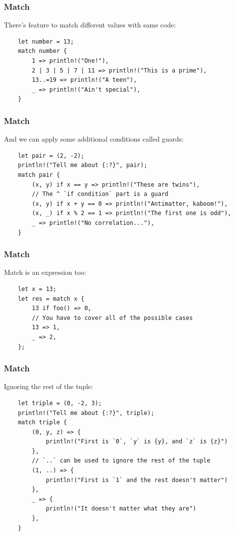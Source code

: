 \documentclass[aspectratio=1610,t]{beamer}
\begin{document}

\begin{frame}[fragile]
\frametitle{Match}
There's feature to match different values with same code:

\begin{verbatim}
    let number = 13;
    match number {
        1 => println!("One!"),
        2 | 3 | 5 | 7 | 11 => println!("This is a prime"),
        13..=19 => println!("A teen"),
        _ => println!("Ain't special"),
    }
\end{verbatim}
\end{frame}


\begin{frame}[fragile]
\frametitle{Match}
And we can apply some additional conditions called guards:

\begin{verbatim}
    let pair = (2, -2);
    println!("Tell me about {:?}", pair);
    match pair {
        (x, y) if x == y => println!("These are twins"),
        // The ^ `if condition` part is a guard
        (x, y) if x + y == 0 => println!("Antimatter, kaboom!"),
        (x, _) if x % 2 == 1 => println!("The first one is odd"),
        _ => println!("No correlation..."),
    }
\end{verbatim}
\end{frame}


\begin{frame}[fragile]
\frametitle{Match}
Match is an expression too:

\begin{verbatim}
    let x = 13;
    let res = match x {
        13 if foo() => 0,
        // You have to cover all of the possible cases
        13 => 1,
        _ => 2,
    };
\end{verbatim}
\end{frame}


\begin{frame}[fragile]
\frametitle{Match}
Ignoring the rest of the tuple:

\begin{verbatim}
    let triple = (0, -2, 3);
    println!("Tell me about {:?}", triple);
    match triple {
        (0, y, z) => {
            println!("First is `0`, `y` is {y}, and `z` is {z}")
        },
        // `..` can be used to ignore the rest of the tuple
        (1, ..) => {
            println!("First is `1` and the rest doesn't matter")
        },
        _ => {
            println!("It doesn't matter what they are")
        },
    }
\end{verbatim}
\end{frame}
\end{document}
